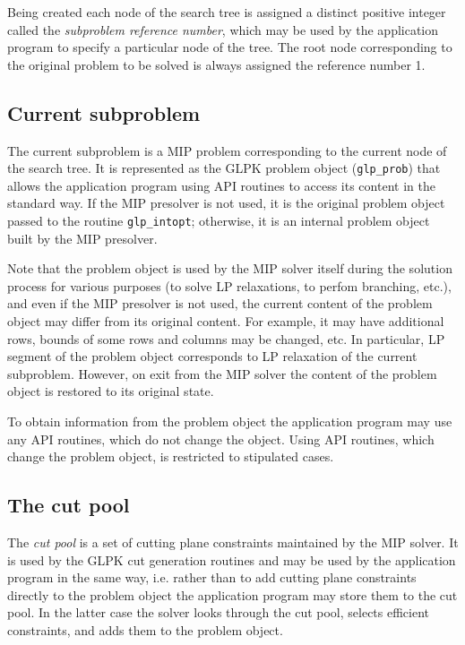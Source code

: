 Being created each node of the search tree is assigned a distinct
positive integer called the {\it subproblem reference number}, which
may be used by the application program to specify a particular node of
the tree. The root node corresponding to the original problem to be
solved is always assigned the reference number 1.

\subsection{Current subproblem}

The current subproblem is a MIP problem corresponding to the current
node of the search tree. It is represented as the GLPK problem object
(\verb|glp_prob|) that allows the application program using API
routines to access its content in the standard way. If the MIP
presolver is not used, it is the original problem object passed to the
routine \verb|glp_intopt|; otherwise, it is an internal problem object
built by the MIP presolver.

Note that the problem object is used by the MIP solver itself during
the solution process for various purposes (to solve LP relaxations, to
perfom branching, etc.), and even if the MIP presolver is not used, the
current content of the problem object may differ from its original
content. For example, it may have additional rows, bounds of some rows
and columns may be changed, etc. In particular, LP segment of the
problem object corresponds to LP relaxation of the current subproblem.
However, on exit from the MIP solver the content of the problem object
is restored to its original state.

To obtain information from the problem object the application program
may use any API routines, which do not change the object. Using API
routines, which change the problem object, is restricted to stipulated
cases.

\subsection{The cut pool}

The {\it cut pool} is a set of cutting plane constraints maintained by
the MIP solver. It is used by the GLPK cut generation routines and may
be used by the application program in the same way, i.e. rather than
to add cutting plane constraints directly to the problem object the
application program may store them to the cut pool. In the latter case
the solver looks through the cut pool, selects efficient constraints,
and adds them to the problem object.

